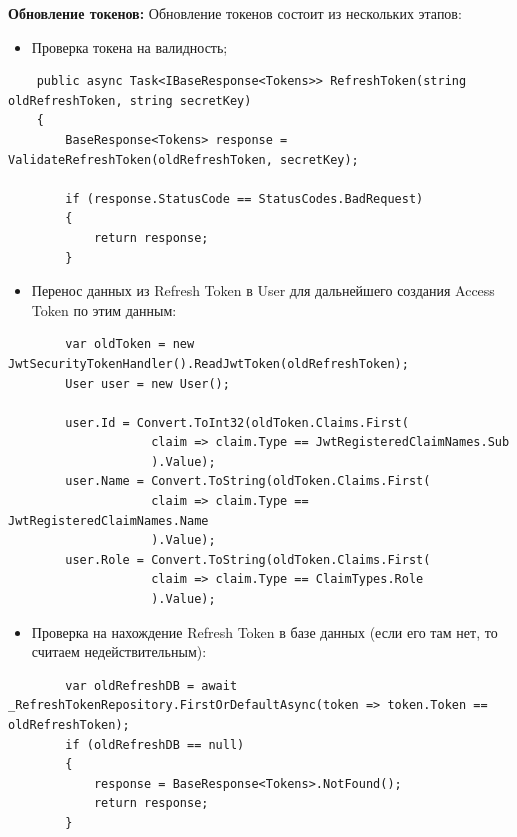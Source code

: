 \textbf{Обновление токенов:} Обновление токенов состоит из нескольких этапов:
\begin{itemize}
	\item{Проверка токена на валидность;}
\end{itemize}
\begin{verbatim}
    public async Task<IBaseResponse<Tokens>> RefreshToken(string oldRefreshToken, string secretKey)
    {
        BaseResponse<Tokens> response = ValidateRefreshToken(oldRefreshToken, secretKey);

        if (response.StatusCode == StatusCodes.BadRequest)
        {
            return response;
        }
\end{verbatim}

\begin{itemize}
	\item{Перенос данных из Refresh Token в User для дальнейшего создания Access Token по этим данным:}
\end{itemize}
\begin{verbatim}
        var oldToken = new JwtSecurityTokenHandler().ReadJwtToken(oldRefreshToken);
        User user = new User();

        user.Id = Convert.ToInt32(oldToken.Claims.First(
                    claim => claim.Type == JwtRegisteredClaimNames.Sub
                    ).Value);
        user.Name = Convert.ToString(oldToken.Claims.First(
                    claim => claim.Type == JwtRegisteredClaimNames.Name
                    ).Value);
        user.Role = Convert.ToString(oldToken.Claims.First(
                    claim => claim.Type == ClaimTypes.Role
                    ).Value);
\end{verbatim}

\begin{itemize}
	\item{Проверка на нахождение Refresh Token в базе данных (если его там нет, то считаем недействительным):}
\end{itemize}
\begin{verbatim}
        var oldRefreshDB = await _RefreshTokenRepository.FirstOrDefaultAsync(token => token.Token == oldRefreshToken);
        if (oldRefreshDB == null)
        {
            response = BaseResponse<Tokens>.NotFound();
            return response;
        }
\end{verbatim}

